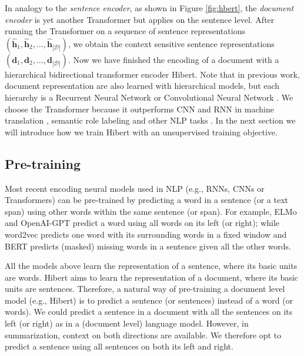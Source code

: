 \documentclass[11pt,a4paper]{article}
\begin{document}
In analogy to the \emph{sentence encoder}, as shown in Figure \ref{fig:hbert}, the \emph{document encoder} is yet another Transformer but applies on the sentence level. After running the Transformer on a sequence of sentence representations $( \hat{\mathbf{h}}_1, \hat{\mathbf{h}}_2, \dots, \hat{\mathbf{h}}_{|\mathcal{D}|} )$, we obtain the context sensitive sentence representations $( \mathbf{d}_1, \mathbf{d}_2, \dots, \mathbf{d}_{|\mathcal{D}|} )$. Now we have finished the encoding of a document with a hierarchical bidirectional transformer encoder {\sc Hibert}. Note that in previous work, document representation are also learned with hierarchical models, but each hierarchy is a Recurrent Neural Network \cite{nallapati:2017:aaai,zhou:2018:acl} or Convolutional Neural Network \cite{cheng:2016:acl}. We choose the Transformer because it outperforms CNN and RNN in machine translation \cite{vaswani:2017:nips}, semantic role labeling \cite{strubell:2018:emnlp} and other NLP tasks \cite{devlin:2018:arxiv}. In the next section we will introduce how we train {\sc Hibert} with an unsupervised training objective.

\subsection{Pre-training}
\label{sec:pretrain}
Most recent encoding neural models used in NLP (e.g., RNNs, CNNs or Transformers) can be pre-trained by  predicting a word in a sentence (or a text span) using other words within the same sentence (or span). For example, ELMo \cite{peters:2018:naacl} and OpenAI-GPT \cite{radford:2018:nips} predict a word using all words on its left (or right); while word2vec \cite{mikolov:2013:nips} predicts one word with its surrounding words in a fixed window and BERT \cite{devlin:2018:arxiv} predicts (masked) missing words in a sentence given all the other words.

All the models above learn the representation of a sentence, where its basic units are words. \mbox{{\sc Hibert}} aims to learn the representation of a document, where its basic units are sentences. Therefore, a natural way of pre-training a document level model (e.g., {\sc Hibert}) is to predict a sentence (or sentences) instead of a word (or words). We could predict a sentence in a document with all the sentences on its left (or right) as in a (document level) language model. However, in summarization, context on both directions are available. We therefore opt to predict a sentence using all sentences on both its left and right. 
\end{document}
